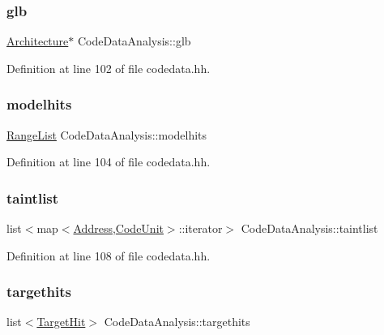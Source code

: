 \subsubsection{\texorpdfstring{glb}{glb}}
{\footnotesize\ttfamily \mbox{\hyperlink{class_architecture}{Architecture}}$\ast$ Code\+Data\+Analysis\+::glb}



Definition at line 102 of file codedata.\+hh.

\mbox{\label{class_code_data_analysis_a626bdcd7e8956d51c4ea0ed0c1473a40}} 
\subsubsection{\texorpdfstring{modelhits}{modelhits}}
{\footnotesize\ttfamily \mbox{\hyperlink{class_range_list}{Range\+List}} Code\+Data\+Analysis\+::modelhits}



Definition at line 104 of file codedata.\+hh.

\mbox{\label{class_code_data_analysis_aeaaace760ea39195437919ece684c69c}} 
\subsubsection{\texorpdfstring{taintlist}{taintlist}}
{\footnotesize\ttfamily list$<$map$<$\mbox{\hyperlink{class_address}{Address}},\mbox{\hyperlink{class_code_unit}{Code\+Unit}}$>$\+::iterator$>$ Code\+Data\+Analysis\+::taintlist}



Definition at line 108 of file codedata.\+hh.

\mbox{\label{class_code_data_analysis_aae3eb34a130a61c4b6ddfb688a10ac3d}} 
\subsubsection{\texorpdfstring{targethits}{targethits}}
{\footnotesize\ttfamily list$<$\mbox{\hyperlink{class_target_hit}{Target\+Hit}}$>$ Code\+Data\+Analysis\+::targethits}



